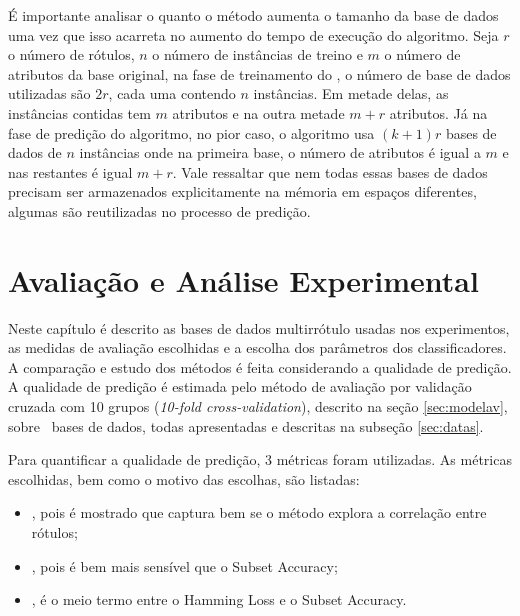 É importante analisar o quanto o método aumenta o tamanho da base de dados uma vez que isso acarreta no aumento
do tempo de execução do algoritmo. Seja $r$ o número de rótulos, $n$ o número de instâncias de treino
e $m$ o número de atributos da base original, na fase de treinamento do \MRLMa, o número de base de dados utilizadas são
$2r$, cada uma contendo $n$ instâncias. Em metade delas, as instâncias contidas tem $m$ atributos e na outra metade $m+r$ atributos.
Já na fase de predição do algoritmo, no pior caso, o algoritmo usa $(k+1)r$ bases de dados de $n$ instâncias onde na primeira base, o
número de atributos é igual a $m$ e nas restantes é igual $m+r$. Vale ressaltar que nem todas essas bases de dados precisam ser
armazenados explicitamente na mémoria em espaços diferentes, algumas são reutilizadas no processo de predição.




\FloatBarrier

\chapter{Avaliação e Análise Experimental}
Neste capítulo é descrito as bases de dados multirrótulo usadas nos experimentos, 
as medidas de avaliação escolhidas e a escolha
dos parâmetros dos classificadores. 
A comparação e estudo dos métodos é feita considerando a qualidade de predição.
A qualidade de predição é estimada pelo método de avaliação
por validação cruzada com 10 grupos (\textit{10-fold cross-validation}), descrito na seção \ref{sec:modelav},
sobre \Nbases~bases de dados, todas apresentadas e descritas na subseção \ref{sec:datas}.

Para quantificar a qualidade de predição, 3 métricas foram utilizadas.
As métricas escolhidas, bem como o motivo das escolhas,
são listadas:
\begin{itemize}
 \item \SA, pois é mostrado que captura bem se o método explora a correlação entre rótulos;
 \item \HL, pois é bem mais sensível que o Subset Accuracy;
 \item \EBA, é o meio termo entre o Hamming Loss e o Subset Accuracy.
\end{itemize}

